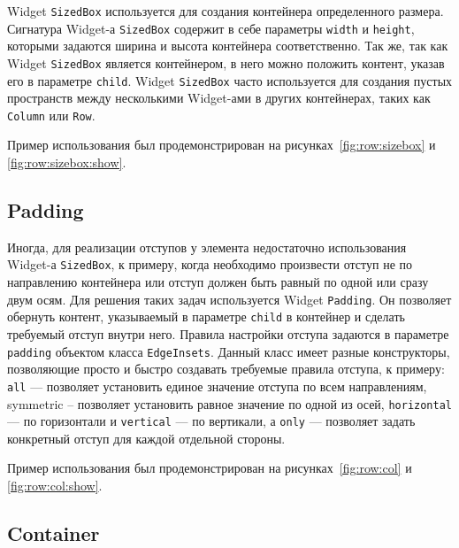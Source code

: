 Widget \texttt{SizedBox} используется
для создания контейнера определенного размера.
Сигнатура Widget-а \texttt{SizedBox} содержит в себе параметры \texttt{width}
и \texttt{height}, которыми задаются ширина и высота контейнера соответственно.
Так же, так как Widget \texttt{SizedBox} является контейнером,
в него можно положить контент, указав его в параметре \texttt{child}.
Widget \texttt{SizedBox} часто используется
для создания пустых пространств между несколькими Widget-ами
в других контейнерах, таких как \texttt{Column} или \texttt{Row}.

Пример использования был продемонстрирован
на рисунках~\ref{fig:row:sizebox} и \ref{fig:row:sizebox:show}.

\subsection{Padding}

Иногда, для реализации отступов у элемента недостаточно использования
Widget-а \texttt{SizedBox}, к примеру,
когда необходимо произвести отступ не по направлению контейнера
или отступ должен быть равный по одной или сразу двум осям.
Для решения таких задач используется Widget \texttt{Padding}.
Он позволяет обернуть контент,
указываемый в параметре \texttt{child} в контейнер
и сделать требуемый отступ внутри него.
Правила настройки отступа задаются
в параметре \texttt{padding} объектом класса \texttt{EdgeInsets}.
Данный класс имеет разные конструкторы,
позволяющие просто и быстро создавать требуемые правила отступа, к примеру:
\texttt{all} --- позволяет установить единое значение отступа
по всем направлениям,
symmetric – позволяет установить равное значение по одной из осей,
\texttt{horizontal} --- по горизонтали
и \texttt{vertical} --- по вертикали,
а \texttt{only} --- позволяет задать конкретный отступ
для каждой отдельной стороны.

Пример использования был продемонстрирован
на рисунках~\ref{fig:row:col} и \ref{fig:row:col:show}.

\subsection{Container}

